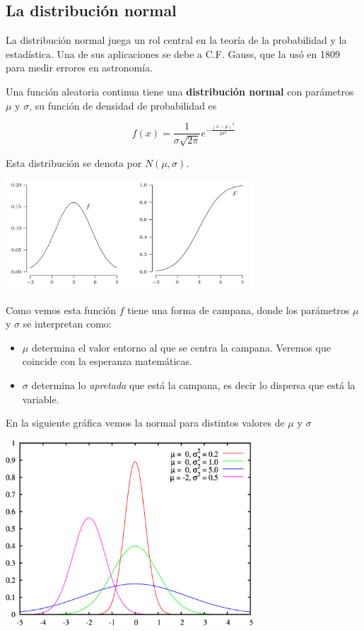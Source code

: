 \documentclass[
]{article}
\providecommand{\tightlist}{%
  \setlength{\itemsep}{0pt}\setlength{\parskip}{0pt}}
\begin{document}
\hypertarget{la-distribuciuxf3n-normal}{%
\subsection{La distribución normal}\label{la-distribuciuxf3n-normal}}

La distribución normal juega un rol central en la teoría de la
probabilidad y la estadística. Una de sus aplicaciones se debe a C.F.
Gauss, que la usó en 1809 para medir errores en astronomía.

Una función aleatoria continua tiene una \textbf{distribución normal}
con parámetros \(\mu\) y \(\sigma\), su función de densidad de
probabilidad es

\[f(x) = \frac{1}{\sigma \sqrt{2\pi}} e^{-\frac{(x-\mu)^2}{2\sigma^2}}\]

Esta distribución se denota por \(N(\mu, \sigma)\).

\includegraphics[width=3.64583in,height=\textheight]{sc_3.png}

Como vemos esta función \(f\) tiene una forma de campana, donde los
parámetros \(\mu\) y \(\sigma\) se interpretan como:

\begin{itemize}
\tightlist
\item
  \(\mu\) determina el valor entorno al que se centra la campana.
  Veremos que coincide con la esperanza matemáticas.
\item
  \(\sigma\) determina lo \emph{apretada} que está la campana, es decir
  lo dispersa que está la variable.
\end{itemize}

En la siguiente gráfica vemos la normal para distintos valores de
\(\mu\) y \(\sigma\)

\includegraphics[width=3.64583in,height=\textheight]{normal2.png}
\end{document}
